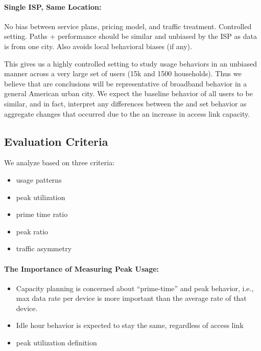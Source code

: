 \paragraph{Single ISP, Same Location:} No bias between service plans, pricing model, and traffic treatment. Controlled setting. Paths + performance should be similar and unbiased by the ISP as data is from one city. Also avoids local behavioral biases (if any).

This gives us a highly controlled setting to study usage behaviors in an unbiased manner across a very large set of users (15k \control and 1500 \test households). Thus we believe that are conclusions will be representative of broadband behavior in a general American urban city. We expect the baseline behavior of all users to be similar, and in fact, interpret any differences between the \control and \test set behavior as aggregate changes that occurred due to the an increase in access link capacity.



\subsection{Evaluation Criteria}

We analyze based on three criteria:
\begin{itemize}
\itemsep0em 
\item usage patterns
\item peak utilization
\item prime time ratio
\item peak ratio
\item traffic asymmetry 
\end{itemize}



\paragraph{The Importance of Measuring Peak Usage:}
\begin{itemize}
\itemsep0em 
\item Capacity planning is concerned about “prime-time” and peak behavior, i.e., max data rate per device is more important than the average rate of that device.
\item Idle hour behavior is expected to stay the same, regardless of access link
\item peak utilization definition
\end{itemize}



